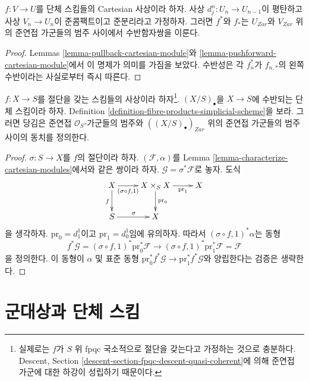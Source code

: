 \begin{lemma}
\label{lemma-adjoint-functors-cartesian-modules}
$f : V \to U$를 단체 스킴들의 Cartesian 사상이라 하자.
사상 $d^n_j : U_n \to U_{n - 1}$이 평탄하고 사상
$V_n \to U_n$이 준콤팩트이고 준분리라고 가정하자.
그러면 $f^*$와 $f_*$는 $U_{Zar}$와 $V_{Zar}$ 위의
준연접 가군들의 범주 사이에서 수반함자쌍을 이룬다.
\end{lemma}

\begin{proof}
Lemmas \ref{lemma-pullback-cartesian-module}와
\ref{lemma-pushforward-cartesian-module}에서 이 명제가 의미를 가짐을
보았다. 수반성은 각 $f_n^*$가 $f_{n, *}$의 왼쪽 수반이라는
사실로부터 즉시 따른다.
\end{proof}

\begin{lemma}
\label{lemma-cartesian-modules-with-section}
$f : X \to S$를 절단을 갖는 스킴들의 사상이라
하자\footnote{실제로는 $f$가 $S$ 위 fpqc 국소적으로 절단을 갖는다고
가정하는 것으로 충분하다. Descent, Section
\ref{descent-section-fpqc-descent-quasi-coherent}에 의해
준연접 가군에 대한 하강이 성립하기 때문이다.}.
$(X/S)_\bullet$을 $X \to S$에 수반되는 단체 스킴이라 하자.
Definition \ref{definition-fibre-products-simplicial-scheme}을 보라.
그러면 당김은 준연접 $\mathcal{O}_S$-가군들의 범주와
$((X/S)_\bullet)_{Zar}$ 위의 준연접 가군들의 범주 사이의 동치를
정의한다.
\end{lemma}

\begin{proof}
$\sigma : S \to X$를 $f$의 절단이라 하자.
$(\mathcal{F}, \alpha)$를 Lemma
\ref{lemma-characterize-cartesian-modules}에서와 같은 쌍이라 하자.
$\mathcal{G} = \sigma^*\mathcal{F}$로 놓자. 도식
$$
\xymatrix{
X \ar[r]_-{(\sigma \circ f, 1)} \ar[d]_f &
X \times_S X \ar[d]^{\text{pr}_0} \ar[r]_-{\text{pr}_1} & X \\
S \ar[r]^\sigma & X
}
$$
을 생각하자. $\text{pr}_0 = d^1_1$이고
$\text{pr}_1 = d^1_0$임에 유의하자. 따라서
$(\sigma \circ f, 1)^*\alpha$는 동형
$$
f^*\mathcal{G} = (\sigma \circ f, 1)^*\text{pr}_0^*\mathcal{F}
\longrightarrow
(\sigma \circ f, 1)^*\text{pr}_1^*\mathcal{F} = \mathcal{F}
$$
을 정의한다. 이 동형이 $\alpha$ 및 표준 동형
$\text{pr}_0^*f^*\mathcal{G} \to \text{pr}_1^*f^*\mathcal{G}$와
양립한다는 검증은 생략한다.
\end{proof}

\section{군대상과 단체 스킴}
\label{section-groupoids-simplicial}

